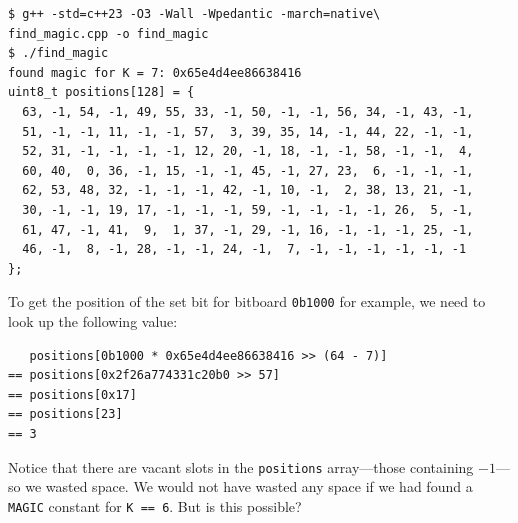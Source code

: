 \documentclass[12pt,a4paper,twoside,openright]{book}
\begin{document}
\begin{itemize}
\begin{mdframed}[skipabove=\baselineskip,skipbelow=0pt,hidealllines=true,backgroundcolor=black!3,innerleftmargin=10pt,innerrightmargin=5pt,innertopmargin=0pt,innerbottommargin=5pt]
\begin{verbatim}
$ g++ -std=c++23 -O3 -Wall -Wpedantic -march=native\
find_magic.cpp -o find_magic
$ ./find_magic
found magic for K = 7: 0x65e4d4ee86638416
uint8_t positions[128] = {
  63, -1, 54, -1, 49, 55, 33, -1, 50, -1, -1, 56, 34, -1, 43, -1,
  51, -1, -1, 11, -1, -1, 57,  3, 39, 35, 14, -1, 44, 22, -1, -1,
  52, 31, -1, -1, -1, -1, 12, 20, -1, 18, -1, -1, 58, -1, -1,  4,
  60, 40,  0, 36, -1, 15, -1, -1, 45, -1, 27, 23,  6, -1, -1, -1,
  62, 53, 48, 32, -1, -1, -1, 42, -1, 10, -1,  2, 38, 13, 21, -1,
  30, -1, -1, 19, 17, -1, -1, -1, 59, -1, -1, -1, -1, 26,  5, -1,
  61, 47, -1, 41,  9,  1, 37, -1, 29, -1, 16, -1, -1, -1, 25, -1,
  46, -1,  8, -1, 28, -1, -1, 24, -1,  7, -1, -1, -1, -1, -1, -1
};
\end{verbatim}
\end{mdframed}

To get the position of the set bit for bitboard \texttt{0b1000} for example, we need to look up the following value:

\begin{verbatim}
   positions[0b1000 * 0x65e4d4ee86638416 >> (64 - 7)]
== positions[0x2f26a774331c20b0 >> 57]
== positions[0x17]
== positions[23]
== 3
\end{verbatim}

Notice that there are vacant slots in the \texttt{positions} array—those containing $-1$—so we wasted space. We would not have wasted any space if we had found a \texttt{MAGIC} constant for \texttt{K == 6}. But is this possible?

\end{itemize}
\end{document}
